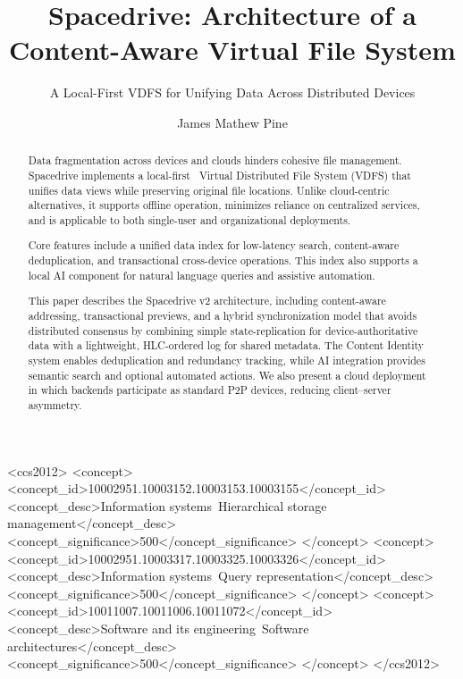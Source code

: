 \documentclass[sigconf]{acmart}
\begin{document}
\title{Spacedrive: Architecture of a Content-Aware Virtual File System}
\subtitle{A Local-First VDFS for Unifying Data Across Distributed Devices}

\author{James Mathew Pine}

\begin{abstract}
Data fragmentation across devices and clouds hinders cohesive file management. Spacedrive implements a local-first~\cite{kleppmann_localfirst_2019} Virtual Distributed File System (VDFS) that unifies data views while preserving original file locations. Unlike cloud-centric alternatives, it supports offline operation, minimizes reliance on centralized services, and is applicable to both single-user and organizational deployments.

Core features include a unified data index for low-latency search, content-aware deduplication, and transactional cross-device operations. This index also supports a local AI component for natural language queries and assistive automation.

This paper describes the Spacedrive v2 architecture, including content-aware addressing, transactional previews, and a hybrid synchronization model that avoids distributed consensus by combining simple state-replication for device-authoritative data with a lightweight, HLC-ordered log for shared metadata. The Content Identity system enables deduplication and redundancy tracking, while AI integration provides semantic search and optional automated actions. We also present a cloud deployment in which backends participate as standard P2P devices, reducing client–server asymmetry.
\end{abstract}


\begin{CCSXML}
<ccs2012>
<concept>
 <concept_id>10002951.10003152.10003153.10003155</concept_id>
 <concept_desc>Information systems~Hierarchical storage management</concept_desc>
 <concept_significance>500</concept_significance>
</concept>
<concept>
 <concept_id>10002951.10003317.10003325.10003326</concept_id>
 <concept_desc>Information systems~Query representation</concept_desc>
 <concept_significance>500</concept_significance>
</concept>
<concept>
 <concept_id>10011007.10011006.10011072</concept_id>
 <concept_desc>Software and its engineering~Software architectures</concept_desc>
 <concept_significance>500</concept_significance>
</concept>
</ccs2012>
\end{CCSXML}
\end{document}
